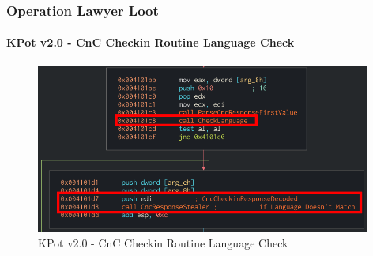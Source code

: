 \documentclass[aspectratio=169]{beamer}
\begin{document}
{
\begin{frame}
  \frametitle{Operation Lawyer Loot}
  \framesubtitle{KPot v2.0 - CnC Checkin Routine Language Check}
  \begin{figure}
    \includegraphics[width=11cm]{kpot-cnc-checkin-lang-check}
    \caption{KPot v2.0 - CnC Checkin Routine Language Check}
  \end{figure}
\end{frame}
}
\end{document}

